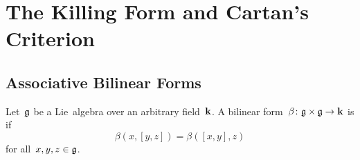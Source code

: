 \section{The Killing Form and Cartan’s Criterion}





\subsection{Associative Bilinear Forms}


\begin{definition}
  \label{associative bilinear form}
  Let~$\mathfrak{g}$ be a Lie~algebra over an arbitrary field~$\mathbf{k}$.
  A bilinear form~$\beta \colon \mathfrak{g} \times \mathfrak{g} \to \mathbf{k}$ is  if
  \[
    \beta(x,[y,z])
    =
    \beta([x,y],z)
  \]
  for all~$x, y, z \in \mathfrak{g}$.
\end{definition}


